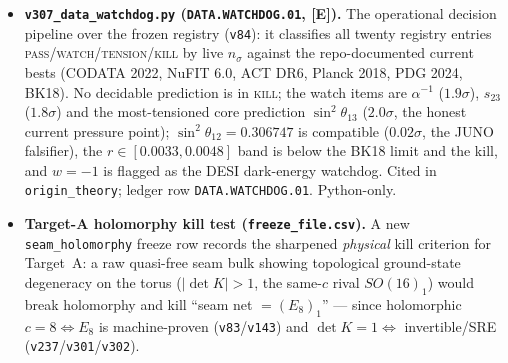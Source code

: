 \documentclass[11pt]{article}
\providecommand{\mE}{\textbf{[E]}}\providecommand{\mC}{\textbf{[C]}}
\begin{document}
\begin{itemize}
\item \textbf{\texttt{v307\_data\_watchdog.py} (\texttt{DATA.WATCHDOG.01}, \mE).} The operational decision pipeline over
  the frozen registry (\texttt{v84}): it classifies all twenty registry entries
  \textsc{pass}/\textsc{watch}/\textsc{tension}/\textsc{kill} by live $n_\sigma$ against the repo-documented current
  bests (CODATA 2022, NuFIT 6.0, ACT DR6, Planck 2018, PDG 2024, BK18). No decidable prediction is in \textsc{kill};
  the watch items are $\alpha^{-1}$ ($1.9\sigma$), $s_{23}$ ($1.8\sigma$) and the most-tensioned core prediction
  $\sin^2\theta_{13}$ ($2.0\sigma$, the honest current pressure point); $\sin^2\theta_{12}=0.306747$ is compatible
  ($0.02\sigma$, the JUNO falsifier), the $r\in[0.0033,0.0048]$ band is below the BK18 limit and the kill, and
  $w{=}{-}1$ is flagged as the DESI dark-energy watchdog. Cited in \texttt{origin\_theory}; ledger row
  \texttt{DATA.WATCHDOG.01}. Python-only.
\item \textbf{Target-A holomorphy kill test (\texttt{freeze\_file.csv}).} A new \texttt{seam\_holomorphy} freeze row
  records the sharpened \emph{physical} kill criterion for Target~A: a raw quasi-free seam bulk showing topological
  ground-state degeneracy on the torus ($|\det K|>1$, the same-$c$ rival $SO(16)_1$) would break holomorphy and kill
  ``seam net $=(E_8)_1$'' --- since holomorphic $c{=}8\Leftrightarrow E_8$ is machine-proven (\texttt{v83}/\texttt{v143})
  and $\det K{=}1\Leftrightarrow$ invertible/SRE (\texttt{v237}/\texttt{v301}/\texttt{v302}).
\end{itemize}
\end{document}
